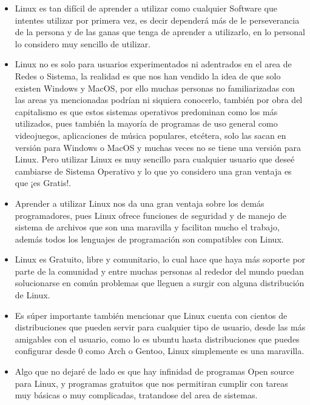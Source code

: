 \documentclass[a4paper, 11pt, oneside]{article}
\begin{document}
\begin{itemize}
    \item Linux es tan difícil de aprender a utilizar como cualquier Software que intentes utilizar por primera vez, es decir dependerá más de le perseverancia de la persona y de las ganas que tenga de aprender a utilizarlo, en lo personal lo considero muy sencillo de utilizar.
    \item Linux no es solo para usuarios experimentados ni adentrados en el area de Redes o Sistema, la realidad es que nos han vendido la idea de que solo existen Windows y MacOS, por ello muchas personas no familiarizadas con las areas ya mencionadas podrían ni siquiera conocerlo, también por obra del capitalismo es que estos sistemas operativos predominan como los más utilizados, pues también la mayoría de programas de uso general como videojuegos, aplicaciones de música populares, etcétera, solo las sacan en versión para Windows o MacOS y muchas veces no se tiene una versión para Linux. Pero utilizar Linux es muy sencillo para cualquier usuario que deseé cambiarse de Sistema Operativo y lo que yo considero una gran ventaja es que ¡es Gratis!.
    \item Aprender a utilizar Linux nos da una gran ventaja sobre los demás programadores, pues Linux ofrece funciones de seguridad y de manejo de sistema de archivos que son una maravilla y facilitan mucho el trabajo, además todos los lenguajes de programación son compatibles con Linux.
    \item Linux es Gratuito, libre y comunitario, lo cual hace que haya más soporte por parte de la comunidad y entre muchas personas al rededor del mundo puedan solucionarse en común problemas que lleguen a surgir con alguna distribución de Linux.
    \item Es súper importante también mencionar que Linux cuenta con cientos de distribuciones que pueden servir para cualquier tipo de usuario, desde las más amigables con el usuario, como lo es ubuntu hasta distribuciones que puedes configurar desde 0 como Arch o Gentoo, Linux simplemente es una maravilla.
    \item Algo que no dejaré de lado es que hay infinidad de programas Open source para Linux, y programas gratuitos que nos permitiran cumplir con tareas muy básicas o muy complicadas, tratandose del area de sistemas.
    \begin{center}

\end{center}
\end{itemize}
\end{document}
